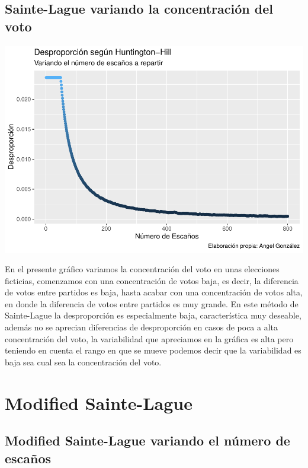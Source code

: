 \documentclass[12pt,a4paper,]{book}
\numberwithin{dummy}{section}
\theoremstyle{ocrenumbox}
\theoremstyle{blacknumex}
\theoremstyle{blacknumbox}
\theoremstyle{ocrenum}
\theoremstyle{ocrenum}
\begin{document}
\hypertarget{sainte-lague-variando-la-concentraciuxf3n-del-voto}{%
\subsection{Sainte-Lague variando la concentración del
voto}\label{sainte-lague-variando-la-concentraciuxf3n-del-voto}}

\begin{center}\includegraphics[width=0.95\linewidth]{figurasR/unnamed-chunk-25-1} \end{center}

En el presente gráfico variamos la concentración del voto en unas
elecciones ficticias, comenzamos con una concentración de votos baja, es
decir, la diferencia de votos entre partidos es baja, hasta acabar con
una concentración de votos alta, en donde la diferencia de votos entre
partidos es muy grande. En este método de Sainte-Lague la desproporción
es especialmente baja, característica muy deseable, además no se
aprecian diferencias de desproporción en casos de poca a alta
concentración del voto, la variabilidad que apreciamos en la gráfica es
alta pero teniendo en cuenta el rango en que se mueve podemos decir que
la variabilidad es baja sea cual sea la concentración del voto.

\hypertarget{modified-sainte-lague}{%
\section{Modified Sainte-Lague}\label{modified-sainte-lague}}

\hypertarget{modified-sainte-lague-variando-el-nuxfamero-de-escauxf1os}{%
\subsection{Modified Sainte-Lague variando el número de
escaños}\label{modified-sainte-lague-variando-el-nuxfamero-de-escauxf1os}}
\end{document}

